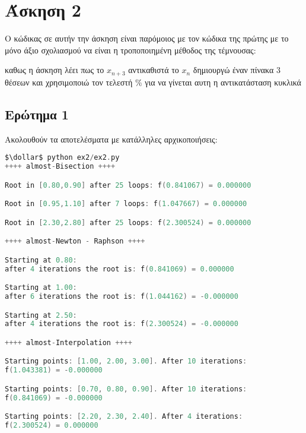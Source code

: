\section{Άσκηση 2}


Ο κώδικας σε αυτήν την άσκηση είναι παρόμοιος με τον κώδικα της πρώτης
με το μόνο άξιο σχολιασμού να είναι η τροποποιημένη μέθοδος της τέμνουσας:


καθως η άσκηση λέει πως το $x_{n+3}$ αντικαθιστά το $x_n$
δημιουργώ έναν πίνακα 3 θέσεων και χρησιμοποιώ τον τελεστή $\%$
για να γίνεται αυτη η αντικατάσταση κυκλικά

\subsection{Ερώτημα 1}

Ακολουθούν τα αποτελέσματα με κατάλληλες αρχικοποιήσεις:
\begin{lstlisting}[language=C, mathescape=true]
$\dollar$ python ex2/ex2.py
++++ almost-Bisection ++++

Root in [0.80,0.90] after 25 loops: f(0.841067) = 0.000000

Root in [0.95,1.10] after 7 loops: f(1.047667) = 0.000000

Root in [2.30,2.80] after 25 loops: f(2.300524) = 0.000000

++++ almost-Newton - Raphson ++++

Starting at 0.80:
after 4 iterations the root is: f(0.841069) = 0.000000

Starting at 1.00:
after 6 iterations the root is: f(1.044162) = -0.000000

Starting at 2.50:
after 4 iterations the root is: f(2.300524) = -0.000000

++++ almost-Interpolation ++++

Starting points: [1.00, 2.00, 3.00]. After 10 iterations:
f(1.043381) = -0.000000

Starting points: [0.70, 0.80, 0.90]. After 10 iterations:
f(0.841069) = -0.000000

Starting points: [2.20, 2.30, 2.40]. After 4 iterations:
f(2.300524) = 0.000000
\end{lstlisting}

